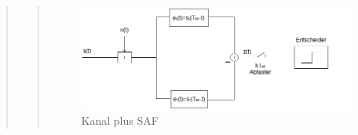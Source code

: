 \begin{quote}
\begin{quote}
       
    \begin{figure}[H]
        \centering
        \includegraphics[scale=0.7]{Bilder/SAF-Filter}
        \caption{Kanal plus SAF}
        \label{fig:Kanal_pl_SAF}
    \end{figure}
     
    \end{quote}
    
   
\end{quote}

